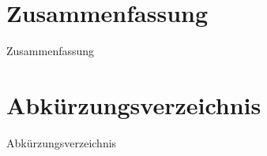 \documentclass[
	12pt,				%
	a4paper,			%
	oneside,			%
	titlepage,			%
	parskip=full,		%
	headings=normal,	%
	fleqn,				%
	final				%
]{scrreprt}
\begin{document}
\cleardoubleoddpage
{}
\chapter*						{Zusammenfassung}
	{Zusammenfassung}



\cleardoubleoddpage
{}
\setcounter{secnumdepth}{5}
\setcounter{tocdepth}{4}

\begin{minipage}[t][][t]{0.95\textwidth}
\tableofcontents
\end{minipage}


\cleardoubleoddpage
\chapter*						{Abkürzungsverzeichnis}
	{Abkürzungsverzeichnis}



%
%
%
\end{document}
